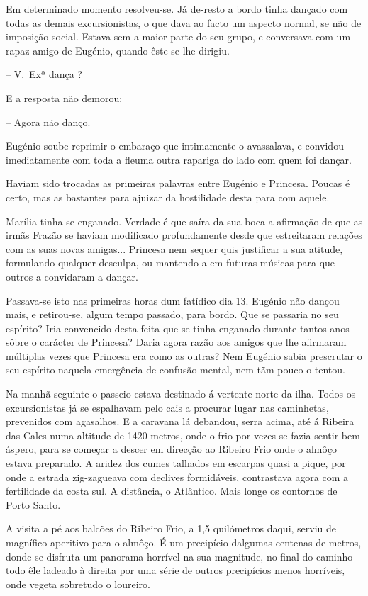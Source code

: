 \documentclass[9pt]{article}
\begin{document}
Em determinado momento resolveu-se. Já de-resto a bordo tinha dan\-çado
com todas as demais excursionistas, o que dava ao facto um aspecto normal,
se não de imposi\-ção social. Estava sem a maior parte do seu grupo, e conversava com um rapaz amigo de Eugé\-nio, quan\-do êste se lhe dirigiu.

-- V.\ Exª dan\-ça ?

E a resposta não demorou:

-- Agora não danço.

Eugé\-nio soube reprimir o embaraço que intimamente o avassalava, e convidou imediatamente com toda a fleuma outra rapariga do lado com quem foi
dan\-çar.

Haviam sido trocadas as primeiras palavras entre Eugé\-nio e Princesa.
Poucas é certo, mas as bastantes para ajuizar da hostilidade desta para com
aquele.

Marília tinha-se enganado. Verdade é que saíra da sua boca a afirma\-ção de que as irmãs Frazão se haviam modifi\-cado profundamente desde que
estreitaram rela\-ções com as suas novas amigas... Princesa nem sequer quis
justifi\-car a sua atitude, formulando qualquer desculpa, ou mantendo-a em futuras músicas para que outros a convidaram a dan\-çar.

Passava-se isto nas primeiras horas dum fatídico dia 13. Eugé\-nio não
dançou mais, e retirou-se, algum tempo passado, para bordo. Que se passaria
no seu espírito? Iria convencido desta feita que se tinha enganado durante tantos anos sôbre o carácter de Princesa? Daria agora razão aos amigos
que lhe afirmaram múltiplas vezes que Princesa era como as outras? Nem
Eugé\-nio sabia prescrutar o seu espírito naquela emergência de confusão mental, nem tãm pouco o tentou.

Na manhã seguinte o passeio estava destinado á vertente norte da ilha.
Todos os excursionistas já se espa\-lhavam pelo cais a procurar lugar nas
caminhetas, prevenidos com agasa\-lhos. E a caravana lá debandou, serra acima,
até á Ribeira das Cales numa altitude de 1420 metros, onde o frio por vezes
se fazia sentir bem áspero, para se começar a descer em direc\-ção ao Ribeiro
Frio onde o almôço estava preparado. A aridez dos cumes ta\-lhados em escarpas quasi a pique, por onde a estrada zig-zagueava com declives formidáveis,
contrastava agora com a fertilidade da costa sul. A distância,
o Atlântico. Mais longe os contornos de Porto Santo.

A visita a pé aos balcões do Ribeiro Frio, a 1,5 quilómetros daqui,
serviu de magnífico aperitivo para o almôço. É um precipício dalgumas centenas de metros, donde se disfruta um panorama horrível na sua magnitude,
no final do caminho todo êle ladeado à direita por uma série de outros
precipícios menos horríveis, onde vegeta sobretudo o loureiro.
\end{document}
